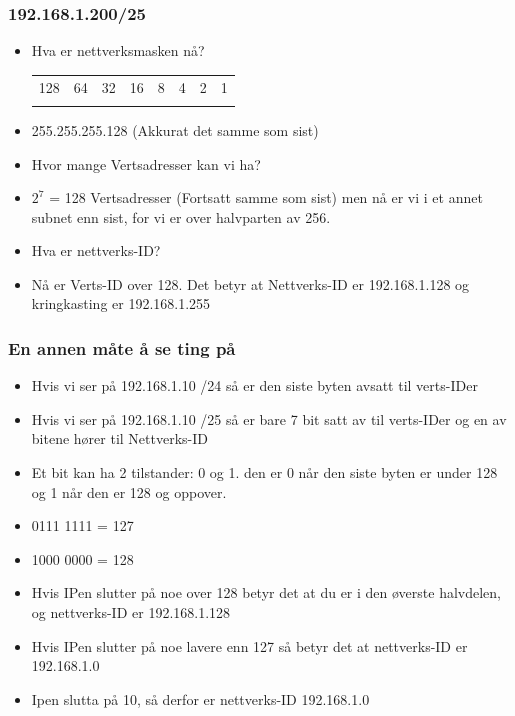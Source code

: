 \documentclass[aspectratio=169,xcolor=dvipsnames]{beamer}
\begin{document}
\begin{frame}
	\frametitle{192.168.1.200/25}

			\begin{itemize}
				\item Hva er nettverksmasken nå?
\begin{center}
\begin{tabular}{ c c c c c c c c}
128 & 64 	& 32 	& 16 	& 8  	& 4	& 2	&  1\\
 &  	&  	&  	&   	& 	& 	&  \\
\end{tabular}
\end{center}
				\item 255.255.255.128 (Akkurat det samme som sist)
				\item Hvor mange Vertsadresser kan vi ha?
				\item $2^7$ = 128 Vertsadresser (Fortsatt samme som sist) men nå er vi i et annet subnet enn sist, for vi er over halvparten av 256.
				\item Hva er nettverks-ID?
				\item Nå er Verts-ID over 128. Det betyr at Nettverks-ID er  192.168.1.128 og kringkasting er 192.168.1.255
			\end{itemize}
\end{frame}
\begin{frame}
	\frametitle{En annen måte å se ting på}

			\begin{itemize}
				\item Hvis vi ser på 192.168.1.10 /24 så er den siste byten avsatt til verts-IDer
				\item Hvis vi ser på 192.168.1.10 /25 så er bare 7 bit satt av til verts-IDer og en av bitene hører til Nettverks-ID
				\item Et bit kan ha 2 tilstander: 0 og 1. den er 0 når den siste byten er under 128 og 1 når den er 128 og oppover.
				\item 0111 1111 = 127
				\item 1000 0000 = 128 
				\item Hvis IPen slutter på noe over 128 betyr det at du er i den øverste halvdelen, og nettverks-ID er 192.168.1.128
				\item Hvis IPen slutter på noe lavere enn 127 så betyr det at nettverks-ID er 192.168.1.0
				\item Ipen slutta på 10, så derfor er nettverks-ID 192.168.1.0
			\end{itemize}
\end{frame}
\end{document}
